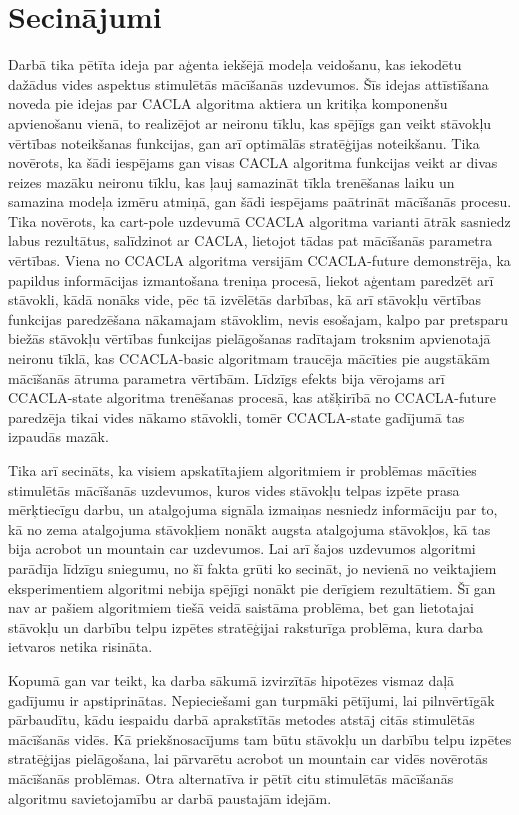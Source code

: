 \documentclass{ludis} %
\begin{document}
\chapter{Secinājumi}
Darbā tika pētīta ideja par aģenta iekšējā modeļa veidošanu, kas iekodētu
dažādus vides aspektus stimulētās mācīšanās uzdevumos. Šīs idejas attīstīšana
noveda pie idejas par CACLA algoritma aktiera un kritiķa komponenšu apvienošanu
vienā, to realizējot ar neironu tīklu, kas spējīgs gan veikt stāvokļu vērtības
noteikšanas funkcijas, gan arī optimālās stratēģijas noteikšanu. Tika novērots,
ka šādi iespējams gan visas CACLA algoritma funkcijas veikt ar divas reizes
mazāku neironu tīklu, kas ļauj samazināt tīkla trenēšanas laiku un samazina
modeļa izmēru atmiņā, gan šādi iespējams paātrināt mācīšanās procesu. Tika
novērots, ka cart-pole uzdevumā CCACLA algoritma varianti ātrāk sasniedz labus
rezultātus, salīdzinot ar CACLA, lietojot tādas pat mācīšanās parametra
vērtības. Viena no CCACLA algoritma versijām CCACLA-future demonstrēja, ka
papildus informācijas izmantošana treniņa procesā, liekot aģentam paredzēt arī
stāvokli, kādā nonāks vide, pēc tā izvēlētās darbības, kā arī stāvokļu vērtības
funkcijas paredzēšana nākamajam stāvoklim, nevis esošajam, kalpo par pretsparu
biežās stāvokļu vērtības funkcijas pielāgošanas radītajam troksnim apvienotajā
neironu tīklā, kas CCACLA-basic algoritmam traucēja mācīties pie augstākām
mācīšanās ātruma parametra vērtībām. Līdzīgs efekts bija vērojams arī
CCACLA-state algoritma trenēšanas procesā, kas atšķirībā no CCACLA-future
paredzēja tikai vides nākamo stāvokli, tomēr CCACLA-state gadījumā tas izpaudās
mazāk.

Tika arī secināts, ka visiem apskatītajiem algoritmiem ir problēmas mācīties
stimulētās mācīšanās uzdevumos, kuros vides stāvokļu telpas izpēte prasa
mērķtiecīgu darbu, un atalgojuma signāla izmaiņas nesniedz informāciju par to,
kā no zema atalgojuma stāvokļiem nonākt augsta atalgojuma stāvokļos, kā tas bija
acrobot un mountain car uzdevumos. Lai arī šajos uzdevumos algoritmi parādīja
līdzīgu sniegumu, no šī fakta grūti ko secināt, jo nevienā no veiktajiem
eksperimentiem algoritmi nebija spējīgi nonākt pie derīgiem rezultātiem. Šī gan
nav ar pašiem algoritmiem tiešā veidā saistāma problēma, bet gan lietotajai
stāvokļu un darbību telpu izpētes stratēģijai raksturīga problēma, kura darba
ietvaros netika risināta.

Kopumā gan var teikt, ka darba sākumā izvirzītās hipotēzes vismaz daļā gadījumu
ir apstiprinātas. Nepieciešami gan turpmāki pētījumi, lai pilnvērtīgāk
pārbaudītu, kādu iespaidu darbā aprakstītās metodes atstāj citās stimulētās
mācīšanās vidēs. Kā priekšnosacījums tam būtu stāvokļu un darbību telpu izpētes
stratēģijas pielāgošana, lai pārvarētu acrobot un mountain car vidēs novērotās
mācīšanās problēmas. Otra alternatīva ir pētīt citu stimulētās mācīšanās
algoritmu savietojamību ar darbā paustajām idejām.


\printbibliography
\end{document}
